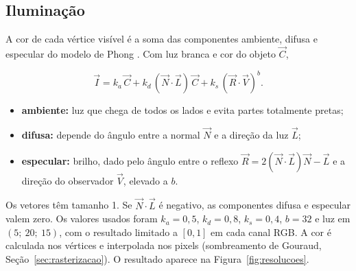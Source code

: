 \subsection{Iluminação}\label{sec:iluminacao}

A cor de cada vértice visível é a soma das componentes ambiente, difusa e especular do modelo de
Phong \cite{phong1975}. Com luz branca e cor do objeto $\vec{C}$,

\begin{equation}
  \vec{I} = k_a \, \vec{C} + k_d \, (\vec{N} \cdot \vec{L}) \, \vec{C} + k_s \, (\vec{R} \cdot \vec{V})^{b} .
\end{equation}

\begin{itemize}
  \item \textbf{ambiente:} luz que chega de todos os lados e evita partes totalmente pretas;
  \item \textbf{difusa:} depende do ângulo entre a normal $\vec{N}$ e a direção da luz $\vec{L}$;
  \item \textbf{especular:} brilho, dado pelo ângulo entre o reflexo $\vec{R} = 2(\vec{N} \cdot \vec{L})\vec{N} - \vec{L}$ e a direção do observador $\vec{V}$, elevado a $b$.
\end{itemize}

Os vetores têm tamanho 1. Se $\vec{N} \cdot \vec{L}$ é negativo, as componentes difusa e especular
valem zero. Os valores usados foram $k_a = 0{,}5$, $k_d = 0{,}8$, $k_s = 0{,}4$, $b = 32$ e luz em
$(5;\ 20;\ 15)$, com o resultado limitado a $[0, 1]$ em cada canal RGB. A cor é calculada nos
vértices e interpolada nos pixels (sombreamento de Gouraud, Seção~\ref{sec:rasterizacao}). O
resultado aparece na Figura~\ref{fig:resolucoes}.
